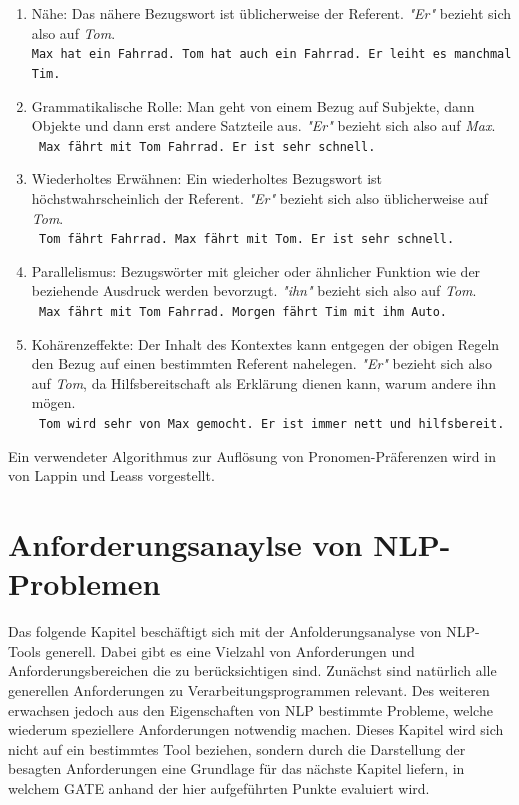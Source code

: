 \documentclass[12pt]{report}
\begin{document}
\begin{enumerate}
\item Nähe: Das nähere Bezugswort ist üblicherweise der Referent. \textit{"Er"} bezieht sich also auf \textit{Tom}.\\
\tt Max hat ein Fahrrad. Tom hat auch ein Fahrrad. Er leiht es manchmal Tim.
\rm
\item Grammatikalische Rolle: Man geht von einem Bezug auf Subjekte, dann Objekte und dann erst andere Satzteile aus. \textit{"Er"} bezieht sich also auf \textit{Max}.\\
\tt
Max fährt mit Tom Fahrrad. Er ist sehr schnell.
\rm
\item Wiederholtes Erwähnen: Ein wiederholtes Bezugswort ist höchstwahrscheinlich der Referent. \textit{"Er"} bezieht sich also üblicherweise auf \textit{Tom}.\\
\tt
Tom fährt Fahrrad. Max fährt mit Tom. Er ist sehr schnell.
\rm
\item Parallelismus: Bezugswörter mit gleicher oder ähnlicher Funktion wie der beziehende Ausdruck werden bevorzugt. \textit{"ihn"} bezieht sich also auf \textit{Tom}. \\
\tt
Max fährt mit Tom Fahrrad. Morgen fährt Tim mit ihm Auto.
\rm
\item Kohärenzeffekte: Der Inhalt des Kontextes kann entgegen der obigen Regeln den Bezug auf einen bestimmten Referent nahelegen. \textit{"Er"} bezieht sich also auf \textit{Tom}, da Hilfsbereitschaft als Erklärung dienen kann, warum andere ihn mögen.\\
\tt
Tom wird sehr von Max gemocht. Er ist immer nett und hilfsbereit.
\rm
\end{enumerate}
Ein verwendeter Algorithmus zur Auflösung von Pronomen-Präferenzen wird in \cite{ll94} von Lappin und Leass vorgestellt.\\

\chapter{Anforderungsanaylse von NLP-Problemen}
Das folgende Kapitel beschäftigt sich mit der Anfolderungsanalyse von NLP-Tools generell. Dabei gibt es eine Vielzahl von Anforderungen und Anforderungsbereichen die zu berücksichtigen sind. Zunächst sind natürlich alle generellen Anforderungen zu Verarbeitungsprogrammen relevant. Des weiteren erwachsen jedoch aus den Eigenschaften von NLP bestimmte Probleme, welche wiederum speziellere Anforderungen notwendig machen. Dieses Kapitel wird sich nicht auf ein bestimmtes Tool beziehen, sondern durch die Darstellung der besagten Anforderungen eine Grundlage für das nächste Kapitel liefern, in welchem GATE anhand der hier aufgeführten Punkte evaluiert wird. 
\end{document}
